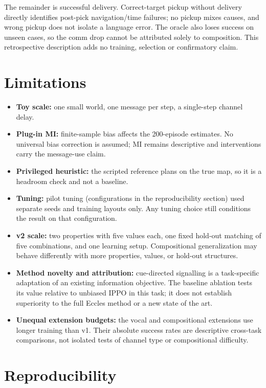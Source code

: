 The remainder is successful delivery. Correct-target pickup without
delivery directly identifies post-pick navigation/time failures; no
pickup mixes causes, and wrong pickup does not isolate a language error.
The oracle also loses success on unseen cases, so the comm drop cannot
be attributed solely to composition. This retrospective description adds
no training, selection or confirmatory claim.

\section{Limitations}\label{limitations}

\begin{itemize}
\tightlist
\item
  \textbf{Toy scale:} one small world, one message per step, a
  single-step channel delay.
\item
  \textbf{Plug-in MI:} finite-sample bias affects the 200-episode
  estimates. No universal bias correction is assumed; MI remains
  descriptive and interventions carry the message-use claim.
\item
  \textbf{Privileged heuristic:} the scripted reference plans on the
  true map, so it is a headroom check and not a baseline.
\item
  \textbf{Tuning:} pilot tuning (configurations in the reproducibility
  section) used separate seeds and training layouts only. Any tuning
  choice still conditions the result on that configuration.
\item
  \textbf{v2 scale:} two properties with five values each, one fixed
  hold-out matching of five combinations, and one learning setup.
  Compositional generalization may behave differently with more
  properties, values, or hold-out structures.
\item
  \textbf{Method novelty and attribution:} cue-directed signalling is a
  task-specific adaptation of an existing information objective. The
  baseline ablation tests its value relative to unbiased IPPO in this
  task; it does not establish superiority to the full Eccles method or a
  new state of the art.
\item
  \textbf{Unequal extension budgets:} the vocal and compositional
  extensions use longer training than v1. Their absolute success rates
  are descriptive cross-task comparisons, not isolated tests of channel
  type or compositional difficulty.
\end{itemize}

\section{Reproducibility}\label{reproducibility}

